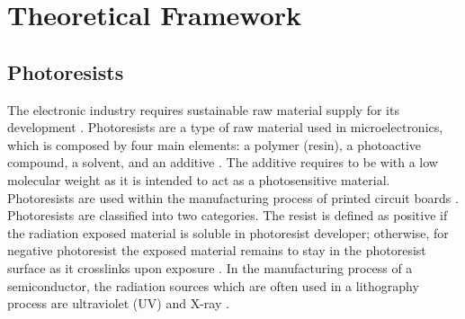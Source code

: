 
\chapter{Theoretical Framework} %

\label{Chapter:TheoreticalFramework}


\section{Photoresists}
The electronic industry requires sustainable raw material supply for its development \cite{Sutikno2016}. Photoresists are a type of raw material used in microelectronics, which is composed by four main elements: a polymer (resin), a photoactive compound, a solvent, and an additive \cite{Schuster2009}. The additive requires to be with a low molecular weight as it is intended to act as a photosensitive material. Photoresists are used within the manufacturing process of printed circuit boards \cite{Staab2011}. Photoresists are classified into two categories. The resist is defined as positive if the radiation exposed material is soluble in photoresist developer; otherwise, for negative photoresist the exposed material remains to stay in the photoresist surface as it crosslinks upon exposure \cite{Landis2011,Sharma2012}. In the manufacturing process of a semiconductor, the radiation sources which are often used in a lithography process are ultraviolet (UV) and X-ray \cite{Mekaru2015}.

